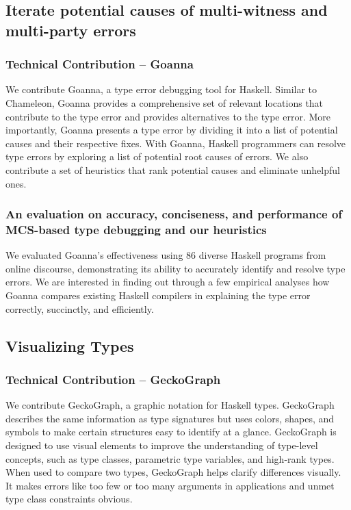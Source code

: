 \subsection{Iterate potential causes of multi-witness and multi-party errors}

\subsubsection{Technical Contribution -- Goanna}
We contribute Goanna, a type error debugging tool for Haskell. 
Similar to Chameleon, Goanna provides a comprehensive set of relevant locations that contribute to the type error and provides alternatives to the type error. More importantly,  Goanna presents a type error by dividing it into a list of potential causes and their respective fixes. With Goanna, Haskell programmers can resolve type errors by exploring a list of potential root causes of errors. We also contribute a set of heuristics that rank potential causes and eliminate unhelpful ones. 

\subsubsection{An evaluation on accuracy, conciseness, and performance of MCS-based type debugging and our heuristics}

We evaluated Goanna's effectiveness using 86 diverse Haskell programs from online discourse, demonstrating its ability to accurately identify and resolve type errors. We are interested in finding out through a few empirical analyses how Goanna compares existing Haskell compilers in explaining the type error correctly, succinctly, and efficiently.


\subsection{Visualizing Types}

\subsubsection{Technical Contribution -- GeckoGraph}

We contribute GeckoGraph, a graphic notation for Haskell types. GeckoGraph describes the same information as type signatures but uses colors, shapes, and symbols to make certain structures easy to identify at a glance. GeckoGraph is designed to use visual elements to improve the understanding of type-level concepts, such as type classes, parametric type variables, and high-rank types. When used to compare two types, GeckoGraph helps clarify differences visually. It makes errors like too few or too many arguments in applications and unmet type class constraints obvious.

